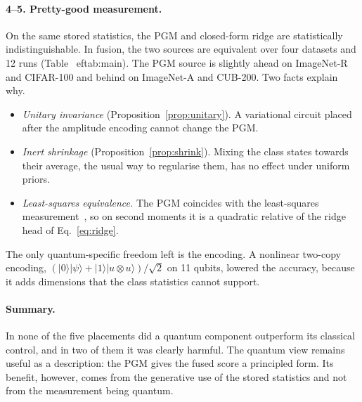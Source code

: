 \paragraph{4--5. Pretty-good measurement.}
On the same stored statistics, the PGM and closed-form ridge are
statistically indistinguishable. In fusion, the two sources are equivalent
over four datasets and 12 runs (Table~
ef{tab:main}). The PGM source is
slightly ahead on ImageNet-R and CIFAR-100 and behind on ImageNet-A and
CUB-200. Two facts explain why.
\begin{itemize}
  \item \emph{Unitary invariance} (Proposition~\ref{prop:unitary}). A
    variational circuit placed after the amplitude encoding cannot change
    the PGM.
  \item \emph{Inert shrinkage} (Proposition~\ref{prop:shrink}). Mixing the
    class states towards their average, the usual way to regularise them,
    has no effect under uniform priors.
  \item \emph{Least-squares equivalence.} The PGM coincides with the
    least-squares measurement~\cite{eldar2001srm}, so on second moments it is
    a quadratic relative of the ridge head of Eq.~\eqref{eq:ridge}.
\end{itemize}
The only quantum-specific freedom left is the encoding. A nonlinear
two-copy encoding, $(|0\rangle|\psi\rangle+|1\rangle|u\otimes u\rangle)/\sqrt2$
on 11 qubits, lowered the accuracy, because it adds dimensions that the
class statistics cannot support.

\paragraph{Summary.}
In none of the five placements did a quantum component outperform its
classical control, and in two of them it was clearly harmful. The quantum
view remains useful as a description: the PGM gives the fused score a
principled form. Its benefit, however, comes from the generative use of
the stored statistics and not from the measurement being quantum.
